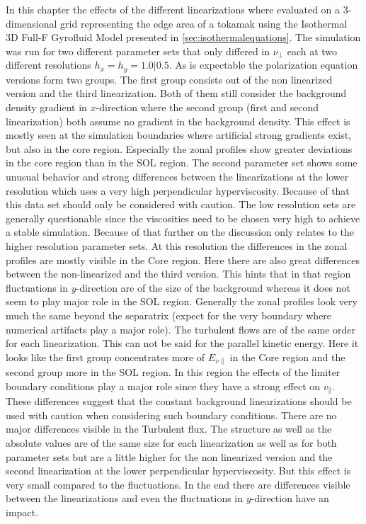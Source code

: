 \documentclass[master.tex]{subfiles}
\begin{document}
In this chapter the effects of the different linearizations where evaluated on a 3-dimensional grid representing the edge area of a tokamak using the Isothermal 3D Full-F Gyrofluid Model presented in \autoref{sec:isothermalequations}. The simulation was run for two different parameter sets that only differed in $\nu_\perp$ each at two different resolutions $h_x=h_y=1.0|0.5$.
As is expectable the polarization equation versions form two groups. The first group consists out of the non linearized version and the third linearization. Both of them still consider the background density gradient in $x$-direction where the second group (first and second linearization) both assume no gradient in the background density. This effect is mostly seen at the simulation boundaries where artificial strong gradients exist, but also in the core region. Especially the zonal profiles show greater deviations in the core region than in the SOL region.\newline
The second parameter set shows some unusual behavior and strong differences between the linearizations at the lower resolution which uses a very high perpendicular hyperviscosity. Because of that this data set should only be considered with caution.\newline
The low resolution sets are generally questionable since the viscosities need to be chosen very high to achieve a stable simulation. Because of that further on the discussion only relates to the higher resolution parameter sets.\newline
At this resolution the differences in the zonal profiles are mostly visible in the Core region. Here there are also great differences between the non-linearized and the third version. This hints that in that region fluctuations in $y$-direction are of the size of the background whereas it does not seem to play major role in the \ac{SOL} region. Generally the zonal profiles look very much the same beyond the separatrix (expect for the very boundary where numerical artifacts play a major role). The turbulent flows are of the same order for each linearization. This can not be said for the parallel kinetic energy. Here it looks like the first group concentrates more of $E_{v\parallel}$ in the Core region and the second group more in the \ac{SOL} region. In this region the effects of the limiter boundary conditions play a major role since they have a strong effect on $v_{\parallel}$. These differences suggest that the constant background linearizations should be used with caution when considering such boundary conditions.\newline
There are no major differences visible in the Turbulent flux. The structure as well as the absolute values are of the same size for each linearization as well as for both parameter sets but are a little higher for the non linearized version and the second linearization at the lower perpendicular hyperviscosity. But this effect is very small compared to the fluctuations.\newline
In the end there are differences visible between the linearizations and even the fluctuations in $y$-direction have an impact.
\end{document}

